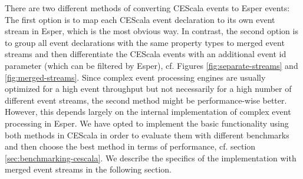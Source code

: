 \documentclass[book,type=bsc,colorback,accentcolor=tud8b,12pt,twoside]{tudthesis}
\begin{document}
There are two different methods of converting CEScala events to Esper events: The first option is to map each CEScala event declaration to its own event stream in Esper, which is the most obvious way.  In contrast, the second option is to group all event declarations with the same property types to merged event streams and then differentiate the CEScala events with an additional event id parameter (which can be filtered by Esper), cf. Figures \ref{fig:separate-streams} and \ref{fig:merged-streams}.  Since complex event processing engines are usually optimized for a high event throughput but not necessarily for a high number of different event streams, the second method might be performance-wise better.  However, this depends largely on the internal implementation of complex event processing in Esper.  We have opted to implement the basic functionality using both methods in CEScala in order to evaluate them with different benchmarks and then choose the best method in terms of performance, cf. section \ref{sec:benchmarking-cescala}.  We describe the specifics of the implementation with merged event streams in the following section.  
\end{document}
